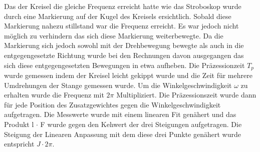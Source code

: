 Das der Kreisel die gleiche Frequenz erreicht hatte wie das Stroboskop wurde durch eine Markierung auf der Kugel des Kreisels ersichtlich. Sobald diese Markierung nahezu stillstand war die Frequenz erreicht. Es war jedoch nicht möglich zu verhindern das sich diese Markierung weiterbewegte. Da die Markierung sich jedoch sowohl mit der Drehbewegung bewegte als auch in die entgegengesetzte Richtung wurde bei den Rechnungen davon ausgegangen das sich diese entgegengesetzten Bewegungen in etwa aufheben. Die Präzessionzeit $T_p$ wurde gemessen indem der Kreisel leicht gekippt wurde und die Zeit für mehrere Umdrehungen der Stange gemessen wurde. Um die Winkelgeschwindigkeit $\omega$ zu erhalten wurde die Frequenz mit $2 \pi$ Multipliziert.
Die Präzessionszeit wurde dann für jede Position des Zusatzgewichtes gegen die Winkelgeschwindigkeit aufgetragen. Die Messwerte wurde mit einem linearen Fit genähert und das Produkt l $\cdot$ F wurde gegen den Kehwert der drei Steigungen aufgetragen. Die Steigung der Linearen Anpassung mit dem diese drei Punkte genähert wurde entspricht $J \cdot 2 \pi$.